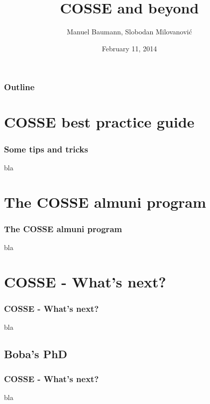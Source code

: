\documentclass{beamer}
\title{\huge{COSSE and beyond}}
\author{Manuel Baumann, Slobodan Milovanovi\'{c}}
\date{\footnotesize{February 11, 2014}}
\begin{document}
\frame{\titlepage}
\begin{frame}
\frametitle{Outline}
\tableofcontents
\end{frame}


\section{COSSE best practice guide}
\begin{frame}
\frametitle{Some tips and tricks}
 bla
\end{frame}

\section{The COSSE almuni program}
\begin{frame}
\frametitle{The COSSE almuni program}
 bla
\end{frame}

\section{COSSE - What's next?}
\begin{frame}
\frametitle{COSSE - What's next?}
 bla
\end{frame}
\subsection{Boba's PhD}
\begin{frame}
\frametitle{COSSE - What's next?}
 bla
\end{frame}
\end{document}
